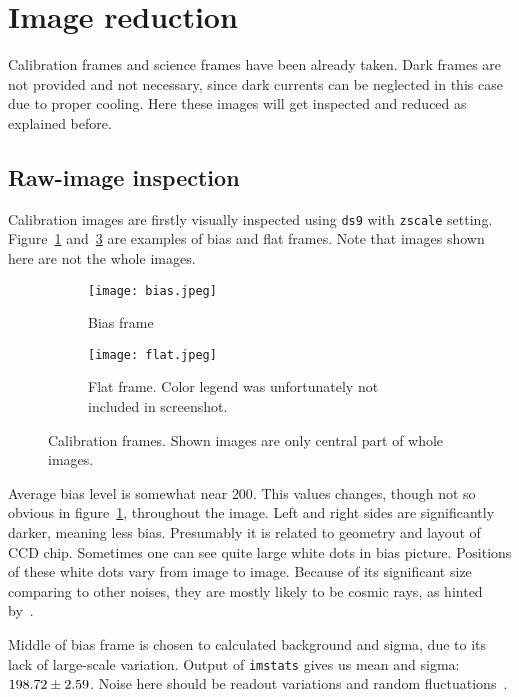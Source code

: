 \clearpage
\section{Image reduction}
Calibration frames and science frames have been already taken. Dark frames are not provided and not necessary, since dark currents can be neglected in this case due to proper cooling. Here these images will get inspected and reduced as explained before.
\subsection{Raw-image inspection}
Calibration images are firstly visually inspected using \verb|ds9| with \verb|zscale| setting. Figure~\ref{fig:bias} and~\ref{fig:flat} are examples of bias and flat frames. Note that images shown here are not the whole images.
\begin{figure}[H]
   \centering
   \begin{subfigure}[b]{0.5\textwidth}
   \begin{center}
   \texttt{[image: bias.jpeg]}
   \end{center}
   \caption{Bias frame}
   \label{fig:bias}
   \end{subfigure}%
   \begin{subfigure}[b]{0.5\textwidth}
   \begin{center}
   \texttt{[image: flat.jpeg]}
   \end{center}
	\caption{Flat frame. Color legend was unfortunately not included in screenshot.}
   \label{fig:flat}
   \end{subfigure}
	\caption[Calibration frames. Shown images are only central part of whole images.]{Calibration frames. Shown images are only central part of whole images.\footnotemark}%
\end{figure}

Average bias level is somewhat near $200$. This values changes, though not so obvious in figure~\ref{fig:bias}, throughout the image. Left and right sides are significantly darker, meaning less bias. Presumably it is related to geometry and layout of CCD chip. Sometimes one can see quite large white dots in bias picture. Positions of these white dots vary from image to image. Because of its significant size comparing to other noises, they are mostly likely to be cosmic rays, as hinted by~\cite{manual}.

Middle of bias frame is chosen to calculated background and sigma, due to its lack of large-scale variation. Output of \verb|imstats| gives us mean and sigma: $\num{198.72 +- 2.59}$. Noise here should be readout variations and random fluctuations~\cite{manual}.

